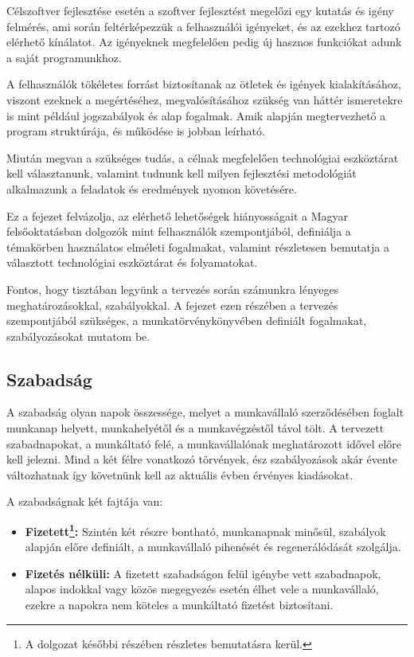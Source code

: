 
Célszoftver fejlesztése esetén a szoftver fejlesztést megelőzi egy kutatás és igény felmérés, ami során feltérképezzük a felhasználói igényeket, és az ezekhez tartozó elérhető kínálatot. Az igényeknek megfelelően pedig új hasznos funkciókat adunk a saját programunkhoz.

A felhasználók tökéletes forrást biztosítanak az ötletek és igények kialakításához, viszont ezeknek a megértéséhez, megvalósításához szükség van háttér ismeretekre is mint például jogszabályok és alap fogalmak. Amik alapján megtervezhető a program struktúrája, és működése is jobban leírható.

Miután megvan a szükséges tudás, a célnak megfelelően technológiai eszköztárat kell választanunk, valamint tudnunk kell milyen fejlesztési metodológiát alkalmazunk a feladatok és eredmények nyomon követésére. 

Ez a fejezet felvázolja, az elérhető lehetőségek hiányosságait a Magyar felsőoktatásban dolgozók mint felhasználók szempontjából, definiálja a témakörben használatos elméleti fogalmakat, valamint részletesen bemutatja a választott technológiai eszköztárat és folyamatokat.


Fontos, hogy tisztában legyünk a tervezés során számunkra lényeges meghatározásokkal, szabályokkal. A fejezet ezen részében a tervezés szempontjából szükséges, a munkatörvénykönyvében definiált fogalmakat, szabályozásokat mutatom be.

\subsection{Szabadság}

A szabadság olyan napok összessége, melyet a munkavállaló szerződésében foglalt munkanap helyett, munkahelyétől és a munkavégzéstől távol tölt. A tervezett szabadnapokat, a munkáltató felé, a munkavállalónak meghatározott idővel előre kell jelezni. Mind a két félre vonatkozó törvények, ész szabályozások akár évente változhatnak így követnünk kell az aktuális évben érvényes kiadásokat.

A szabadságnak két fajtája van:
\begin{itemize}
	\item \textbf{Fizetett\footnote{A dolgozat későbbi részében részletes bemutatásra kerül.}:} Szintén két részre bontható, munkanapnak minősül, szabályok alapján előre definiált, a munkavállaló pihenését és regenerálódását szolgálja. 
	\item \textbf{Fizetés nélküli:} A fizetett szabadságon felül igénybe vett szabadnapok, alapos indokkal vagy közös megegyezés esetén élhet vele a munkavállaló, ezekre a napokra nem köteles a munkáltató fizetést biztosítani. \cite{fizetesNelkuliSzabadsag}
\end{itemize}

